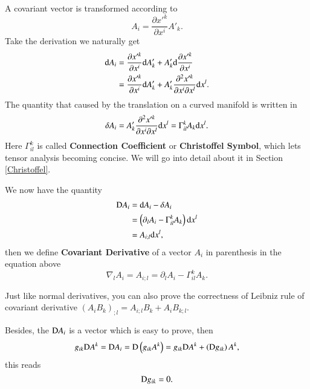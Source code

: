 \documentclass[openany,10pt]{book}
\theoremstyle{definition}
\theoremstyle{definition}
\theoremstyle{remark}
\begin{document}
A covariant vector is transformed according to
\begin{equation}
    A_i=\frac{\partial x'^k}{\partial x^i}A'_k.
\end{equation}
Take the derivation we naturally get
\begin{equation}\begin{aligned}
    {\rm d}A_i&=\frac{\partial x'^k}{\partial x^i}{\rm d}A'_k+A'_k{\rm d}\frac{\partial x'^k}{\partial x^i}    \\
    &=\frac{\partial x'^k}{\partial x^i}{\rm d}A'_k+A'_k\frac{\partial^2 x'^k}{\partial x^i\partial x^l}{\rm d}x^l.
\end{aligned}
\end{equation}
The quantity that caused by the translation on a curved manifold is written in \begin{equation}
\delta A_i=A'_k\frac{\partial^2 x'^k}{\partial x^i\partial x^l}{\rm d}x^l=\Gamma^k_{il}A_k{\rm d}x^l.
\end{equation}
Here $\Gamma^k_{il}$ is called \textbf{Connection Coefficient} or \textbf{Christoffel Symbol}, which lets tensor analysis becoming concise. We will go into detail about it in Section \ref{Christoffel}.

We now have the quantity 
\begin{equation}\begin{aligned}
    {\rm D}A_i&={\rm d}A_i-\delta A_i\\
    &=\left(\partial_lA_i-\Gamma^k_{il}A_k\right){\rm d}x^l\\
    &=A_{i;l}{\rm d}x^l,
    \end{aligned}
\end{equation}
then we define {\bfseries Covariant Derivative} of a vector $A_i$ in parenthesis in the equation above
\begin{equation}
    \boxed{\nabla_l A_i=A_{i;l}=\partial_lA_i-\Gamma^k_{il}A_k.}
\end{equation}


Just like normal derivatives, you can also prove the correctness of Leibniz rule of covariant derivative $(A_iB_k)_{;l}=A_{i;l}B_k+A_iB_{k;l}$.

Besides, the ${\rm D}A_i$ is a vector which is easy to prove, then
 \begin{equation}
    g_{ik}{\rm D}A^k={\rm D}A_i={\rm D}\left(g_{ik}A^k\right)=g_{ik}{\rm D}A^k+\left({\rm D}g_{ik}\right)A^k,
\end{equation}
this reads 
\begin{equation}\label{metriccov}
    {\rm D}g_{ik}=0.
\end{equation}
\end{document}
